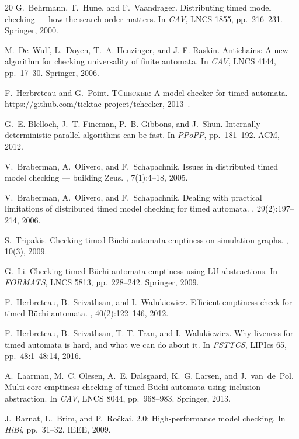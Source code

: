 \documentclass[runningheads]{llncs}
\begin{document}
\begin{thebibliography}{20}
G.~Behrmann, T.~Hune, and F.~Vaandrager.
\newblock Distributing timed model checking --- how the search order matters.
\newblock In {\em CAV}, LNCS 1855, pp.~216--231. Springer, 2000.

M.~De~Wulf, L.~Doyen, T.~A. Henzinger, and J.-F. Raskin.
\newblock Antichains: A new algorithm for checking universality of finite
  automata.
\newblock In {\em CAV}, LNCS 4144, pp.~17--30. Springer, 2006.

F.~Herbreteau and G.~Point.
\newblock \textsc{TChecker}: A model checker for timed automata.
\newblock \url{https://github.com/ticktac-project/tchecker}, 2013--.

G.~E. Blelloch, J.~T. Fineman, P.~B. Gibbons, and J.~Shun.
\newblock Internally deterministic parallel algorithms can be fast.
\newblock In {\em PPoPP}, pp.~181--192. ACM, 2012.

V.~Braberman, A.~Olivero, and F.~Schapachnik.
\newblock Issues in distributed timed model checking --- building {\sc Zeus}.
, 7(1):4--18, 2005.

V.~Braberman, A.~Olivero, and F.~Schapachnik.
\newblock Dealing with practical limitations of distributed timed model checking
  for timed automata.
, 29(2):197--214, 2006.

S.~Tripakis.
\newblock Checking timed {B}\"uchi automata emptiness on simulation graphs.
, 10(3), 2009.

G.~Li.
\newblock Checking timed {B}\"uchi automata emptiness using {LU}-abstractions.
\newblock In {\em FORMATS}, LNCS 5813, pp.~228--242. Springer, 2009.

F.~Herbreteau, B.~Srivathsan, and I.~Walukiewicz.
\newblock Efficient emptiness check for timed {B}\"uchi automata.
, 40(2):122--146, 2012.

F.~Herbreteau, B.~Srivathsan, T.-T. Tran, and I.~Walukiewicz.
\newblock Why liveness for timed automata is hard, and what we can do about it.
\newblock In {\em FSTTCS}, LIPIcs 65, pp.~48:1--48:14, 2016.

A.~Laarman, M.~C. Olesen, A.~E. Dalsgaard, K.~G. Larsen, and J.~van~de~Pol.
\newblock Multi-core emptiness checking of timed {B}\"uchi automata using
  inclusion abstraction.
\newblock In {\em CAV}, LNCS 8044, pp.~968--983. Springer, 2013.

J.~Barnat, L.~Brim, and P.~Ro\v{c}kai.
 2.0: High-performance model checking.
\newblock In {\em HiBi}, pp.~31--32. IEEE, 2009.

\end{thebibliography}
\end{document}
